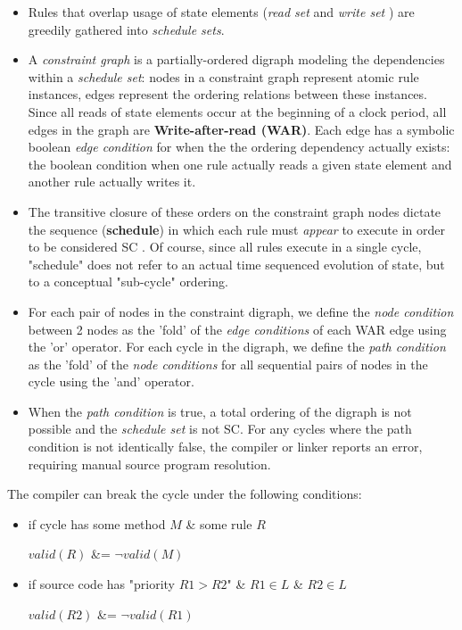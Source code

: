 \begin{itemize}
\item Rules that overlap usage of state elements
(\textit{read set} and \textit{write set}\cite[Sec.~10.1.2]{OV11} \cite{RosenkrantzSternsLewis})
are greedily gathered into \textit{schedule sets}.
\item A \textit{constraint graph} is a partially-ordered digraph modeling
the dependencies within a \textit{schedule set}:
nodes in a constraint graph represent atomic rule instances, edges
represent the ordering relations between these instances\cite[Sec.~3]{Cain2003}.
Since all reads of state elements occur at the beginning of a clock period,
all edges in the graph are \textbf{Write-after-read (WAR)}.
Each edge has a symbolic boolean \textit{edge condition} for when the
the ordering dependency actually exists: the boolean
condition when one rule actually reads a given state element
and another rule actually writes it.

\item The transitive closure of these orders on the constraint graph nodes
dictate the sequence (\textbf{schedule}) in which each rule must \textit{appear} to execute in
order to be considered SC
\cite[Sec.~11.1]{OV11}.
Of course, since all rules execute in a single cycle, "schedule" does not
refer to an actual time sequenced evolution of state,
but to a conceptual "sub-cycle" ordering.

\item For each pair of nodes in the constraint digraph, we define the \textit{node condition}
between 2 nodes as the 'fold' of the \textit{edge conditions} of each WAR edge
using the 'or' operator.
For each cycle in the digraph, we define the \textit{path condition}
as the 'fold' of the \textit{node conditions} for all sequential pairs of nodes
in the cycle using the 'and' operator.

\item When the \textit{path condition} is true, a total ordering of
the digraph is not possible and the \textit{schedule set} is not SC.
For any cycles where the path condition is not identically false,
the compiler or linker reports an error,
requiring manual source program resolution.
\end{itemize}

The compiler can break the cycle under the following conditions:
\begin{itemize}
\item if cycle has some method $M$ \& some rule $R$

              $valid(R)$ \&= $\neg valid(M)$
\item if source code has "priority $R1 > R2$" \& $R1 \in L$ \& $R2 \in L$

              $valid(R2)$ \&= $\neg valid(R1)$
\end{itemize}

